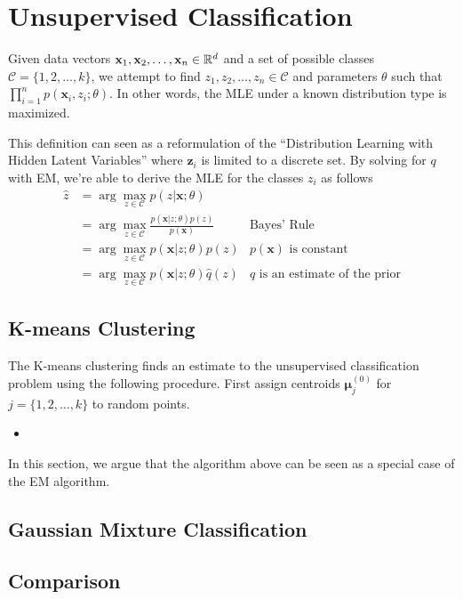 \section{Unsupervised Classification}
\begin{definition}
    Given data vectors $\mathbf{x}_1,\mathbf{x}_2,\dots,\mathbf{x}_n\in\mathbb{R}^d$ and a set of possible classes $\mathcal{C}=\{1,2,\dots,k\}$, we attempt to find $z_1,z_2,\dots,z_n\in \mathcal{C}$ and parameters $\theta$ such that $\prod_{i=1}^n p(\mathbf{x}_i,z_i;\theta)$. In other words, the MLE under a known distribution type is maximized.
\end{definition}
This definition can seen as a reformulation of the ``Distribution Learning with Hidden Latent Variables'' where $\mathbf{z}_i$ is limited to a discrete set. By solving for $q$ with EM, we're able to derive the MLE for the classes $z_i$ as follows
\begin{align*}
    \hat{z} 
    &= \arg\max_{z\in\mathcal{C}} p(z|\mathbf{x};\theta) \\
    &= \arg\max_{z\in\mathcal{C}} \frac{p(\mathbf{x}|z;\theta)p(z)}{p(\mathbf{x})} & \text{Bayes' Rule}\\
    &= \arg\max_{z\in\mathcal{C}} p(\mathbf{x}|z;\theta)p(z) & p(\mathbf{x})\text{ is constant} \\
    &= \arg\max_{z\in\mathcal{C}} p(\mathbf{x}|z;\theta)\hat{q}(z) & \hat{q}\text{ is an estimate of the prior}
\end{align*}

\subsection{K-means Clustering}
The K-means clustering finds an estimate to the unsupervised classification problem using the following procedure. First assign centroids $\boldsymbol{\mu}_j^{(0)}$ for $j=\{1,2,\dots,k\}$ to random points.
\begin{itemize}
    \item 
\end{itemize}
In this section, we argue that the algorithm above can be seen as a special case of the EM algorithm.
\subsection{Gaussian Mixture Classification}
\subsection{Comparison}